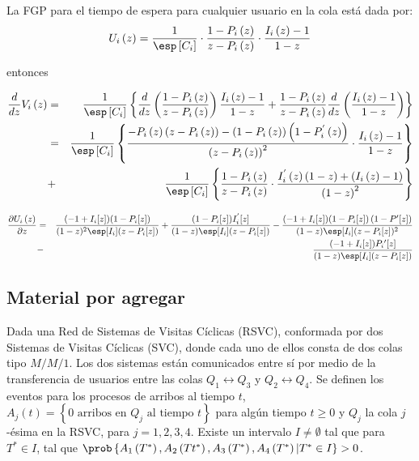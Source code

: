 La FGP para el tiempo de espera para cualquier usuario en la cola est\'a dada por:
\[U_{i}\left(z\right)=\frac{1}{\esp\left[C_{i}\right]}\cdot\frac{1-P_{i}\left(z\right)}{z-P_{i}\left(z\right)}\cdot\frac{I_{i}\left(z\right)-1}{1-z}\]

entonces


\begin{eqnarray*}
\frac{d}{dz}V_{i}\left(z\right)&=&\frac{1}{\esp\left[C_{i}\right]}\left\{\frac{d}{dz}\left(\frac{1-P_{i}\left(z\right)}{z-P_{i}\left(z\right)}\right)\frac{I_{i}\left(z\right)-1}{1-z}+\frac{1-P_{i}\left(z\right)}{z-P_{i}\left(z\right)}\frac{d}{dz}\left(\frac{I_{i}\left(z\right)-1}{1-z}\right)\right\}\\
&=&\frac{1}{\esp\left[C_{i}\right]}\left\{\frac{-P_{i}\left(z\right)\left(z-P_{i}\left(z\right)\right)-\left(1-P_{i}\left(z\right)\right)\left(1-P_{i}^{'}\left(z\right)\right)}{\left(z-P_{i}\left(z\right)\right)^{2}}\cdot\frac{I_{i}\left(z\right)-1}{1-z}\right\}\\
&+&\frac{1}{\esp\left[C_{i}\right]}\left\{\frac{1-P_{i}\left(z\right)}{z-P_{i}\left(z\right)}\cdot\frac{I_{i}^{'}\left(z\right)\left(1-z\right)+\left(I_{i}\left(z\right)-1\right)}{\left(1-z\right)^{2}}\right\}
\end{eqnarray*}


\begin{eqnarray*}
\frac{\partial U_{i}\left(z\right)}{\partial z}&=&\frac{(-1+I_{i}[z]) (1-P_{i}[z])}{(1-z)^2 \esp[I_{i}] (z-P_{i}[z])}+\frac{(1-P_{i}[z]) I_{i}^{'}[z]}{(1-z) \esp[I_{i}] (z-P_{i}[z])}-\frac{(-1+I_{i}[z]) (1-P_{i}[z])\left(1-P{'}[z]\right)}{(1-z) \esp[I_{i}] (z-P_{i}[z])^2}\\
&-&\frac{(-1+I_{i}[z]) P_{i}{'}[z]}{(1-z) \esp[I_{i}](z-P_{i}[z])}
\end{eqnarray*}


\subsection{Material por agregar}


\begin{Teo}
Dada una Red de Sistemas de Visitas C\'iclicas (RSVC), conformada por dos Sistemas de Visitas C\'iclicas (SVC), donde cada uno de ellos consta de dos colas tipo $M/M/1$. Los dos sistemas est\'an comunicados entre s\'i por medio de la transferencia de usuarios entre las colas $Q_{1}\leftrightarrow Q_{3}$ y $Q_{2}\leftrightarrow Q_{4}$. Se definen los eventos para los procesos de arribos al tiempo $t$, $A_{j}\left(t\right)=\left\{0 \textrm{ arribos en }Q_{j}\textrm{ al tiempo }t\right\}$ para alg\'un tiempo $t\geq0$ y $Q_{j}$ la cola $j$-\'esima en la RSVC, para $j=1,2,3,4$.  Existe un intervalo $I\neq\emptyset$ tal que para $T^{*}\in I$, tal que $\prob\left\{A_{1}\left(T^{*}\right),A_{2}\left(Tt^{*}\right),
A_{3}\left(T^{*}\right),A_{4}\left(T^{*}\right)|T^{*}\in I\right\}>0$.
\end{Teo}



